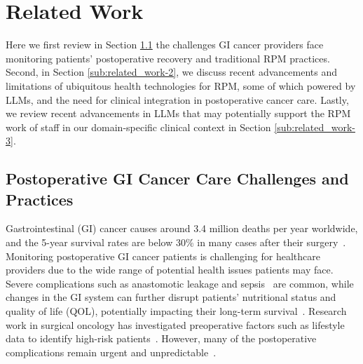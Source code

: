\section{Related Work}
\label{sec:2-related_work}
Here we first review in Section \ref{sub:related_work-1}  the challenges GI cancer providers face monitoring patients' postoperative recovery and traditional RPM practices. Second, in Section \ref{sub:related_work-2}, we discuss recent advancements and limitations of ubiquitous health technologies for RPM, some of which powered by LLMs, and the need for clinical integration in postoperative cancer care.
Lastly, we review recent advancements in LLMs that may potentially support the RPM work of staff in our domain-specific clinical context in Section \ref{sub:related_work-3}.

\subsection{Postoperative GI Cancer Care Challenges and Practices}
\label{sub:related_work-1}
Gastrointestinal (GI) cancer causes around 3.4 million deaths per year worldwide, and the 5-year survival rates are below 30\% in many cases after their surgery~\cite{arnoldGlobalBurdenMajor2020, mocanSurgicalManagementGastric2021,wongGlobalIncidenceMortality2021}. 
Monitoring postoperative GI cancer patients is challenging for healthcare providers due to the wide range of potential health issues patients may face. Severe complications such as anastomotic leakage and sepsis~\cite{vankootenPreoperativeRiskFactors2021, yasunagaBodyMassIndex2013} are common, while changes in the GI system can further disrupt patients' nutritional status and quality of life (QOL), potentially impacting their long-term survival~\cite{carmichaelEarlyPostoperativeFeeding2022, garthNutritionalStatusNutrition2010, yasunagaBodyMassIndex2013}.
Research work in surgical oncology has investigated preoperative factors such as lifestyle data to identify high-risk patients~\cite{vankootenPreoperativeRiskFactors2021}. 
However, many of the postoperative complications remain urgent and unpredictable~\cite{mocanSurgicalManagementGastric2021, vankootenPreoperativeRiskFactors2021}. 


